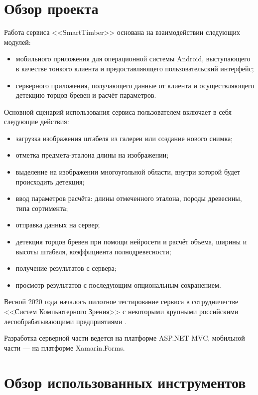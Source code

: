 \documentclass[14pt]{matmex-diploma-custom}
\begin{document}
\section*{Обзор проекта}

Работа сервиса <<SmartTimber>> \cite{timberweb} основана на взаимодействии следующих модулей:

\begin{itemize}  
\item мобильного приложения для операционной системы Android, выступающего в качестве тонкого клиента и предоставляющего пользовательский интерфейс;
\item серверного приложения, получающего данные от клиента и осуществляющего детекцию торцов бревен и расчёт параметров.
\end{itemize}

 Основной сценарий использования сервиса пользователем включает в себя следующие действия:
 
\begin{itemize}  
\item загрузка изображения штабеля из галереи или создание нового снимка;
\item отметка предмета-эталона длины на изображении;
\item выделение на изображении многоугольной области, внутри которой будет происходить детекция;
\item ввод параметров расчёта: длины отмеченного эталона, породы древесины, типа сортимента;
\item отправка данных на сервер;
\item детекция торцов бревен при помощи нейросети и расчёт объема, ширины и высоты штабеля, коэффициента полнодревесности;
\item получение результатов с сервера;
\item просмотр результатов с последующим опциональным сохранением.
\end{itemize}

Весной 2020 года началось пилотное тестирование сервиса в сотрудничестве <<Систем Компьютерного Зрения>> с некоторыми крупными российскими лесообрабатывающими предприятиями \cite{vedomosti}.

Разработка серверной части ведется на платформе ASP.NET MVC, мобильной части --- на платформе Xamarin.Forms.

 \section*{Обзор использованных инструментов}
 
\end{document}
